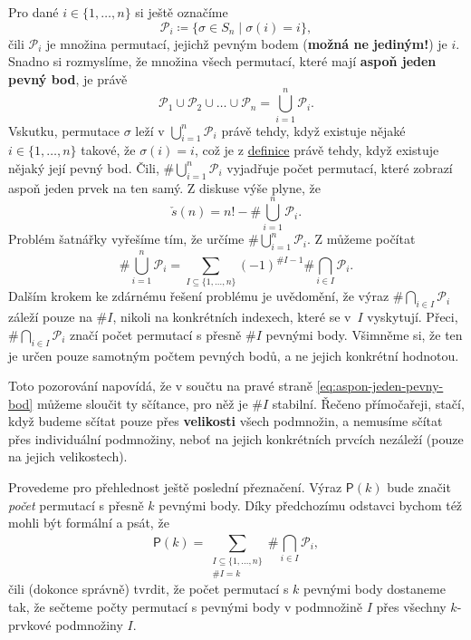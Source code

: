 Pro dané $i  \in \{1,\ldots,n\}$ si ještě označíme
\[
 \mathcal{P}_i \coloneqq \{\sigma \in S_n \mid \sigma(i) = i\},
\]
čili $\mathcal{P}_i$ je množina permutací, jejichž pevným bodem (\textbf{možná
ne jediným!}) je $i$. Snadno si rozmyslíme, že množina všech permutací, které
mají \textbf{aspoň jeden pevný bod}, je právě
\[
 \mathcal{P}_1 \cup \mathcal{P}_2  \cup \ldots \cup \mathcal{P}_n =
 \bigcup_{i=1}^{n} \mathcal{P}_i.
\]
Vskutku, permutace $\sigma$ leží v $\bigcup_{i=1}^{n} \mathcal{P}_i$ právě
tehdy, když existuje nějaké ${i  \in \{1,\ldots,n\}}$ takové, že $\sigma(i) =
i$, což je z \hyperref[def:pevny-bod]{definice} právě tehdy, když existuje
nějaký její pevný bod. Čili, $\# \bigcup_{i=1}^{n} \mathcal{P}_i$ vyjadřuje
počet permutací, které zobrazí aspoň jeden prvek na ten samý. Z diskuse výše
plyne, že
\[
 \check{s}(n) = n! - \# \bigcup_{i=1}^{n} \mathcal{P}_i.
\]
Problém šatnářky vyřešíme tím, že určíme $\# \bigcup_{i=1}^{n} \mathcal{P}_i$. Z
 můžeme počítat
\begin{equation*}
 \label{eq:aspon-jeden-pevny-bod}
 \tag{$\square$}
 \# \bigcup_{i=1}^{n} \mathcal{P}_i = \sum_{I \subseteq \{1,\ldots,n\}}^{}
 (-1)^{\# I-1}\# \bigcap_{i \in  I}^{} \mathcal{P}_i.
\end{equation*}
Dalším krokem ke zdárnému řešení problému je uvědomění, že výraz $\# \bigcap_{i
\in  I}^{} \mathcal{P}_i$ záleží pouze na $\# I$, nikoli na konkrétních
indexech, které se v~$I$ vyskytují. Přeci, $\# \bigcap_{i \in  I}^{}
\mathcal{P}_i$ značí počet permutací s přesně $\# I$ pevnými body. Všimněme si,
že ten je určen pouze samotným počtem pevných bodů, a ne jejich konkrétní
hodnotou.

Toto pozorování napovídá, že v součtu na pravé straně
\eqref{eq:aspon-jeden-pevny-bod} můžeme sloučit ty sčítance, pro něž je $\# I$
stabilní. Řečeno přímočařeji, stačí, když budeme sčítat pouze přes
\textbf{velikosti} všech podmnožin, a nemusíme sčítat přes individuální
podmnožiny, neboť na jejich konkrétních prvcích nezáleží (pouze na jejich
velikostech).

Provedeme pro přehlednost ještě poslední přeznačení. Výraz $\mathsf{P}(k)$ bude
značit \emph{počet} permutací s přesně $k$ pevnými body. Díky předchozímu
odstavci bychom též mohli být formální a psát, že
\[
 \mathsf{P}(k) = \sum_{\substack{I \subseteq \{1,\ldots,n\}\\ \#I = k}}
 \#\bigcap_{i \in  I}^{} \mathcal{P}_i,
\]
čili (dokonce správně) tvrdit, že počet permutací s $k$ pevnými body dostaneme
tak, že sečteme počty permutací s pevnými body v podmnožině $I$ přes všechny
$k$-prvkové podmnožiny $I$.

